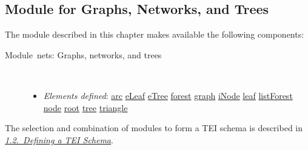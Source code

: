 \subsection[{Module for Graphs, Networks, and Trees}]{Module for Graphs, Networks, and Trees}\par
The module described in this chapter makes available the following components: \begin{description}

\item[{Module nets: Graphs, networks, and trees}]\hspace{1em}\hfill\linebreak
\mbox{}\\[-10pt] \begin{itemize}
\item {\itshape Elements defined}: \hyperref[TEI.arc]{arc} \hyperref[TEI.eLeaf]{eLeaf} \hyperref[TEI.eTree]{eTree} \hyperref[TEI.forest]{forest} \hyperref[TEI.graph]{graph} \hyperref[TEI.iNode]{iNode} \hyperref[TEI.leaf]{leaf} \hyperref[TEI.listForest]{listForest} \hyperref[TEI.node]{node} \hyperref[TEI.root]{root} \hyperref[TEI.tree]{tree} \hyperref[TEI.triangle]{triangle}
\end{itemize} 
\end{description}  The selection and combination of modules to form a TEI schema is described in \textit{\hyperref[STIN]{1.2.\ Defining a TEI Schema}}.